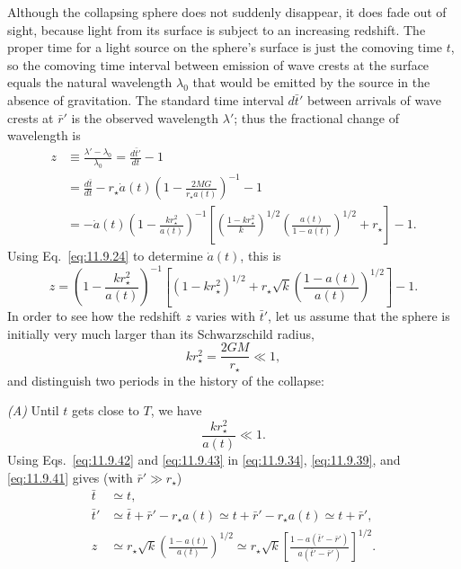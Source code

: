 Although the collapsing sphere does not suddenly disappear, it does fade out
of sight, because light from its surface is subject to an increasing redshift.
The proper time for a light source on the sphere's surface is just the
comoving time \(t\), so the comoving time interval between emission of wave
crests at the surface equals the natural wavelength \(\lambda_0\) that would
be emitted by the source in the absence of gravitation. The standard time
interval \(d\bar t'\) between arrivals of wave crests at \(\bar r'\) is the
observed wavelength \(\lambda'\); thus the fractional change of wavelength is
\[
  \begin{aligned}
  z
  &\equiv\frac{\lambda'-\lambda_0}{\lambda_0}
   =\frac{d\bar t'}{dt}-1\\
  &=\frac{d\bar t}{dt}
    -r_\star\dot a(t)
     \left(1-\frac{2MG}{r_\star a(t)}\right)^{-1}
    -1\\
  &=-\dot a(t)
    \left(1-\frac{kr_\star^2}{a(t)}\right)^{-1}
    \left[
      \left(\frac{1-kr_\star^2}{k}\right)^{1/2}
      \left(\frac{a(t)}{1-a(t)}\right)^{1/2}
      +r_\star
    \right]-1.
  \end{aligned}
\]
Using Eq.~\eqref{eq:11.9.24} to determine \(\dot a(t)\), this is
\begin{equation}
  z
  =
  \left(1-\frac{kr_\star^2}{a(t)}\right)^{-1}
  \left[
    (1-kr_\star^2)^{1/2}
    +r_\star\sqrt k
     \left(\frac{1-a(t)}{a(t)}\right)^{1/2}
  \right]-1.
  \tag{11.9.41}\label{eq:11.9.41}
\end{equation}
In order to see how the redshift \(z\) varies with \(\bar t'\), let us assume
that the sphere is initially very much larger than its Schwarzschild radius,
\begin{equation}
  kr_\star^2=\frac{2GM}{r_\star}\ll1,
  \tag{11.9.42}\label{eq:11.9.42}
\end{equation}
and distinguish two periods in the history of the collapse:

\emph{(A)} Until \(t\) gets close to \(T\), we have
\begin{equation}
  \frac{kr_\star^2}{a(t)}\ll1.
  \tag{11.9.43}\label{eq:11.9.43}
\end{equation}
Using Eqs.~\eqref{eq:11.9.42} and \eqref{eq:11.9.43} in
\eqref{eq:11.9.34}, \eqref{eq:11.9.39}, and \eqref{eq:11.9.41} gives
(with \(\bar r'\gg r_\star\))
\begin{equation}
  \begin{aligned}
  \bar t&\simeq t,\\
  \bar t'
  &\simeq\bar t+\bar r'-r_\star a(t)
   \simeq t+\bar r'-r_\star a(t)
   \simeq t+\bar r',\\
  z
  &\simeq
  r_\star\sqrt k
  \left(\frac{1-a(t)}{a(t)}\right)^{1/2}
  \simeq
  r_\star\sqrt k
  \left[
    \frac{1-a(\bar t'-\bar r')}{a(\bar t'-\bar r')}
  \right]^{1/2}.
  \end{aligned}
  \tag{11.9.44}\label{eq:11.9.44}
\end{equation}

